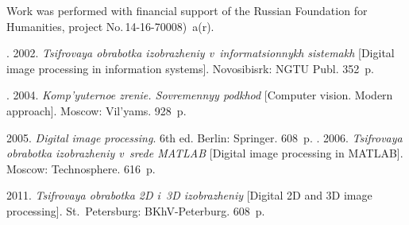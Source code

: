 

\Ack
\noindent
Work was performed with financial support of the Russian Foundation for Humanities,
project No.\,14-16-70008)~a(r).



  \begin{multicols}{2}

\renewcommand{\bibname}{\protect\rmfamily References}

{\small\frenchspacing
 {%
 \begin{thebibliography}{99}
 
. 2002.
\textit{Tsifrovaya obrabotka izob\-ra\-zheniy v~informatsionnykh sistemakh}
[Digital image processing in information systems]. Novosibisrk:  NGTU Publ. 352~p.

. 2004.
\textit{Komp'yuternoe zrenie. Sovremennyy podkhod}
[Computer vision. Modern approach]. Moscow: Vil'yams. 928~p.

 2005. \textit{Digital image processing}. 6th ed.
Berlin: Springer. 608~p.
.
2006. \textit{Tsifrovaya obrabotka izobrazheniy v~srede MATLAB} [Digital image
processing in MATLAB]. Moscow: Technosphere. 616~p.

 2011. \textit{Tsifrovaya obrabotka 2D i~3D
izobrazheniy} [Digital 2D and 3D image processing].
St.\ Petersburg: BKhV-Peterburg. 608~p.



\end{thebibliography}}}
\end{multicols}
